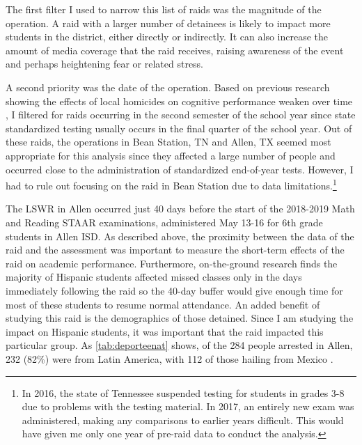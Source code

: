 \documentclass[hidelinks,twoside]{article}
\begin{document}
The first filter I used to narrow this list of raids was the magnitude of the operation. A raid with a larger number of detainees is likely to impact more students in the district, either directly or indirectly. It can also increase the amount of media coverage that the raid receives, raising awareness of the event and perhaps heightening fear or related stress. 

A second priority was the date of the operation. Based on previous research showing the effects of local homicides on cognitive performance weaken over time \citep{sharkey_2010_the}, I filtered for raids occurring in the second semester of the school year since state standardized testing usually occurs in the final quarter of the school year. Out of these raids, the operations in Bean Station, TN and Allen, TX seemed most appropriate for this analysis since they affected a large number of people and occurred close to the administration of standardized end-of-year tests. However, I had to rule out focusing on the raid in Bean Station due to data limitations.\footnote{In 2016, the state of Tennessee suspended testing for students in grades 3-8 due to problems with the testing material. In 2017, an entirely new exam was administered, making any comparisons to earlier years difficult. This would have given me only one year of pre-raid data to conduct the analysis.} 

The LSWR in Allen occurred just 40 days before the start of the 2018-2019 Math and Reading STAAR examinations, administered May 13-16 for 6th grade students in Allen ISD. As described above, the proximity between the data of the raid and the assessment was important to measure the short-term effects of the raid on academic performance. Furthermore, on-the-ground research finds the majority of Hispanic students affected missed classes only in the days immediately following the raid \citep{cervantes_2020_the} so the 40-day buffer would give enough time for most of these students to resume normal attendance. An added benefit of studying this raid is the demographics of those detained. Since I am studying the impact on Hispanic students, it was important that the raid impacted this particular group. As \autoref{tab:deporteenat} shows, of the 284 people arrested in Allen, 232 (82\%) were from Latin America, with 112 of those hailing from Mexico \citep{chvez_2019_heres}.
\end{document}
